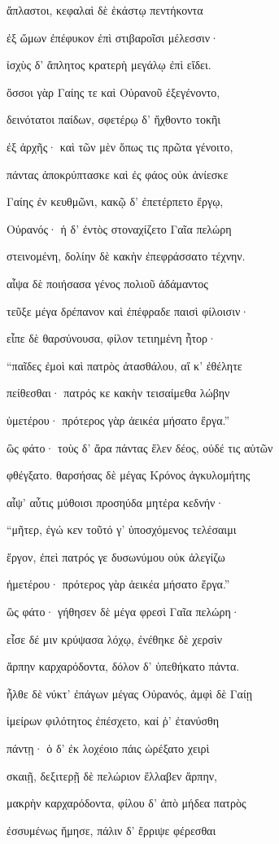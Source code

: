 \begin{pages}
\begin{Leftside}
ἄπλαστοι, κεφαλαὶ δὲ ἑκάστῳ πεντήκοντα

ἐξ ὤμων ἐπέφυκον ἐπὶ στιβαροῖσι μέλεσσιν· 

ἰσχὺς δ' ἄπλητος κρατερὴ μεγάλῳ ἐπὶ εἴδει.

ὅσσοι γὰρ Γαίης τε καὶ Οὐρανοῦ ἐξεγένοντο,

δεινότατοι παίδων, σφετέρῳ δ' ἤχθοντο τοκῆι 

ἐξ ἀρχῆς· καὶ τῶν μὲν ὅπως τις πρῶτα γένοιτο, 

πάντας ἀποκρύπτασκε καὶ ἐς φάος οὐκ ἀνίεσκε

Γαίης ἐν κευθμῶνι, κακῷ δ' ἐπετέρπετο ἔργῳ, 

Οὐρανός· ἡ δ' ἐντὸς στοναχίζετο Γαῖα πελώρη

στεινομένη, δολίην δὲ κακὴν ἐπεφράσσατο τέχνην. 

αἶψα δὲ ποιήσασα γένος πολιοῦ ἀδάμαντος

τεῦξε μέγα δρέπανον καὶ ἐπέφραδε παισὶ φίλοισιν· 

εἶπε δὲ θαρσύνουσα, φίλον τετιημένη ἦτορ·

``παῖδες ἐμοὶ καὶ πατρὸς ἀτασθάλου, αἴ κ' ἐθέλητε

πείθεσθαι· πατρός κε κακὴν τεισαίμεθα λώβην 

ὑμετέρου· πρότερος γὰρ ἀεικέα μήσατο ἔργα.'' 

ὣς φάτο· τοὺς δ' ἄρα πάντας ἕλεν δέος, οὐδέ τις αὐτῶν

φθέγξατο. θαρσήσας δὲ μέγας Κρόνος ἀγκυλομήτης

αἶψ' αὖτις μύθοισι προσηύδα μητέρα κεδνήν·

``μῆτερ, ἐγώ κεν τοῦτό γ' ὑποσχόμενος τελέσαιμι  

ἔργον, ἐπεὶ πατρός γε δυσωνύμου οὐκ ἀλεγίζω

ἡμετέρου· πρότερος γὰρ ἀεικέα μήσατο ἔργα.''

ὣς φάτο· γήθησεν δὲ μέγα φρεσὶ Γαῖα πελώρη· 

εἷσε δέ μιν κρύψασα λόχῳ, ἐνέθηκε δὲ χερσὶν 

ἅρπην καρχαρόδοντα, δόλον δ' ὑπεθήκατο πάντα.  

ἦλθε δὲ νύκτ' ἐπάγων μέγας Οὐρανός, ἀμφὶ δὲ Γαίῃ

ἱμείρων φιλότητος ἐπέσχετο, καί ῥ' ἐτανύσθη

πάντῃ· ὁ δ' ἐκ λοχέοιο πάις ὠρέξατο χειρὶ

σκαιῇ, δεξιτερῇ δὲ πελώριον ἔλλαβεν ἅρπην,

μακρὴν καρχαρόδοντα, φίλου δ' ἀπὸ μήδεα πατρὸς 

ἐσσυμένως ἤμησε, πάλιν δ' ἔρριψε φέρεσθαι


\end{Leftside}
\end{pages}
